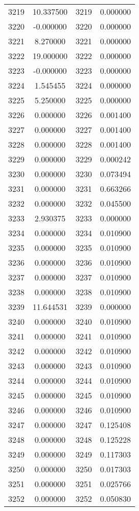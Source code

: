 \documentclass[12pt]{article}
\begin{document}
\begin{longtable}{@{}cccc@{}}
3219 & 10.337500 & 3219 & 0.000000 \\
3220 & -0.000000 & 3220 & 0.000000 \\
3221 & 8.270000 & 3221 & 0.000000 \\
3222 & 19.000000 & 3222 & 0.000000 \\
3223 & -0.000000 & 3223 & 0.000000 \\
3224 & 1.545455 & 3224 & 0.000000 \\
3225 & 5.250000 & 3225 & 0.000000 \\
3226 & 0.000000 & 3226 & 0.001400 \\
3227 & 0.000000 & 3227 & 0.001400 \\
3228 & 0.000000 & 3228 & 0.001400 \\
3229 & 0.000000 & 3229 & 0.000242 \\
3230 & 0.000000 & 3230 & 0.073494 \\
3231 & 0.000000 & 3231 & 0.663266 \\
3232 & 0.000000 & 3232 & 0.045500 \\
3233 & 2.930375 & 3233 & 0.000000 \\
3234 & 0.000000 & 3234 & 0.010900 \\
3235 & 0.000000 & 3235 & 0.010900 \\
3236 & 0.000000 & 3236 & 0.010900 \\
3237 & 0.000000 & 3237 & 0.010900 \\
3238 & 0.000000 & 3238 & 0.010900 \\
3239 & 11.644531 & 3239 & 0.000000 \\
3240 & 0.000000 & 3240 & 0.010900 \\
3241 & 0.000000 & 3241 & 0.010900 \\
3242 & 0.000000 & 3242 & 0.010900 \\
3243 & 0.000000 & 3243 & 0.010900 \\
3244 & 0.000000 & 3244 & 0.010900 \\
3245 & 0.000000 & 3245 & 0.010900 \\
3246 & 0.000000 & 3246 & 0.010900 \\
3247 & 0.000000 & 3247 & 0.125408 \\
3248 & 0.000000 & 3248 & 0.125228 \\
3249 & 0.000000 & 3249 & 0.117303 \\
3250 & 0.000000 & 3250 & 0.017303 \\
3251 & 0.000000 & 3251 & 0.025766 \\
3252 & 0.000000 & 3252 & 0.050830 \\

\end{longtable}
\end{document}
